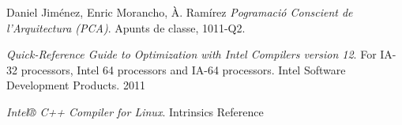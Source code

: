 \documentclass[final,a4paper,11pt,catalan]{report}
\begin{document}


\tableofcontents
\newpage










\begin{thebibliography}{9}

  Daniel Jiménez, Enric Morancho, À. Ramírez
  \emph{Pogramació Conscient de l'Arquitectura (PCA)}.
  Apunts de classe,
  1011-Q2.

  \emph{Quick-Reference Guide to Optimization with Intel Compilers version 12}. For IA-32 processors, Intel 64 processors and IA-64 processors. Intel Software Development Products. 2011

  \emph{Intel® C++ Compiler for Linux}. Intrinsics Reference

\end{thebibliography}
\end{document}
